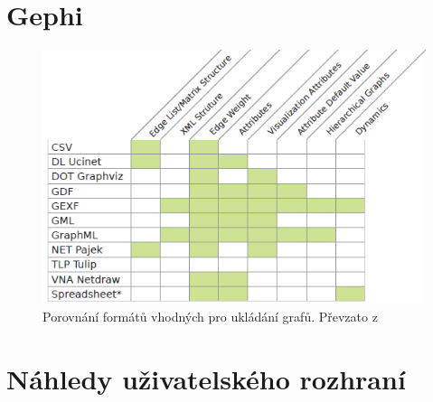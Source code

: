 \documentclass[thesis=M,czech]{FITthesis}[2014/05/6]
\begin{document}
\chapter{Gephi}
\begin{figure}\centering
 	\includegraphics[width=1\textwidth]{images/gephi/graph-format-table-comparison}
 	\caption[Porovnání formátů vhodných pro ukládání grafů]{Porovnání formátů vhodných pro ukládání grafů. Převzato z \cite{gephi}}\label{fig:gephi-formats-comparation}
\end{figure}

\chapter{Náhledy uživatelského rozhraní}
\end{document}
